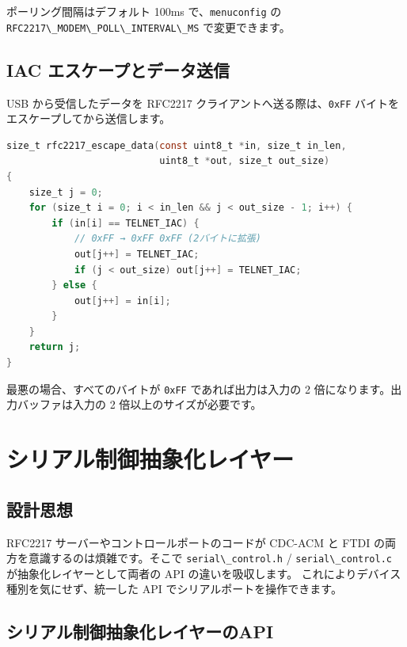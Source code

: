 \documentclass[10pt,twoside,openany,a4j]{ltjsbook}
\newcommand{\passthrough}[1]{#1}
\begin{document}
ポーリング間隔はデフォルト 100ms
で、\passthrough{\lstinline!menuconfig!} の
\passthrough{\lstinline!RFC2217\_MODEM\_POLL\_INTERVAL\_MS!}
で変更できます。

\section{IAC
エスケープとデータ送信}\label{iac-ux30a8ux30b9ux30b1ux30fcux30d7ux3068ux30c7ux30fcux30bfux9001ux4fe1}

USB から受信したデータを RFC2217
クライアントへ送る際は、\passthrough{\lstinline!0xFF!}
バイトをエスケープしてから送信します。

\begin{lstlisting}[language=C]
size_t rfc2217_escape_data(const uint8_t *in, size_t in_len,
                           uint8_t *out, size_t out_size)
{
    size_t j = 0;
    for (size_t i = 0; i < in_len && j < out_size - 1; i++) {
        if (in[i] == TELNET_IAC) {
            // 0xFF → 0xFF 0xFF (2バイトに拡張)
            out[j++] = TELNET_IAC;
            if (j < out_size) out[j++] = TELNET_IAC;
        } else {
            out[j++] = in[i];
        }
    }
    return j;
}
\end{lstlisting}

最悪の場合、すべてのバイトが \passthrough{\lstinline!0xFF!}
であれば出力は入力の 2 倍になります。出力バッファは入力の 2
倍以上のサイズが必要です。

\chapter{シリアル制御抽象化レイヤー}\label{ux30b7ux30eaux30a2ux30ebux5236ux5fa1ux62bdux8c61ux5316ux30ecux30a4ux30e4ux30fc}

\section{設計思想}\label{ux8a2dux8a08ux601dux60f3}

RFC2217 サーバーやコントロールポートのコードが CDC-ACM と FTDI
の両方を意識するのは煩雑です。そこで
\passthrough{\lstinline!serial\_control.h!} /
\passthrough{\lstinline!serial\_control.c!} が抽象化レイヤーとして両者の
API の違いを吸収します。 これによりデバイス種別を気にせず、統一した API
でシリアルポートを操作できます。

\section{シリアル制御抽象化レイヤーのAPI}\label{ux30b7ux30eaux30a2ux30ebux5236ux5fa1ux62bdux8c61ux5316ux30ecux30a4ux30e4ux30fcux306eapi}
\end{document}
